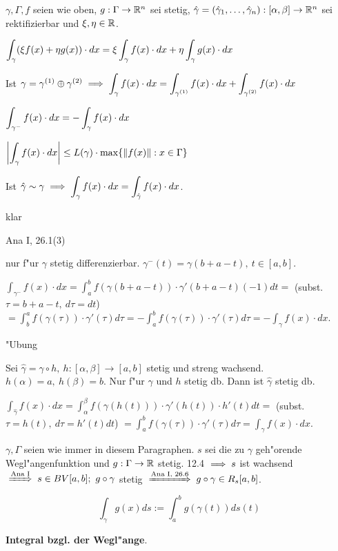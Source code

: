 \documentclass[a4paper,twoside,DIV15,BCOR12mm,chapterprefix=true,headings=twolinechapter]{scrbook}
\begin{document}
\begin{satz}
$\gamma,\Gamma,f$ seien wie oben, $g:\Gamma\to\mathbb{R}^n$ sei stetig, $\hat\gamma = (\hat{\gamma}_1,\ldots,\hat{\gamma}_n): [\alpha,\beta] \to \mathbb{R}^n$ sei rektifizierbar und $\xi,\eta \in \mathbb{R}$.
\begin{liste}
\item $\displaystyle{\int_\gamma(\xi f(x)+\eta g(x))\cdot dx = \xi \int_\gamma f(x)\cdot dx+\eta \int_\gamma g(x)\cdot dx}$
\item Ist $\gamma = \gamma^{(1)} \oplus \gamma^{(2)} \implies \displaystyle{\int_\gamma f(x)\cdot dx = \int_{\gamma^{(1)}} f(x)\cdot dx + \int_{\gamma^{(2)}} f(x)\cdot dx}$
\item $\displaystyle{\int_{\gamma^-} f(x)\cdot dx = -\int_\gamma f(x)\cdot dx}$
\item $\displaystyle{\left| \int_\gamma f(x)\cdot dx\right| \le L(\gamma)\cdot \max\{\|f(x)\|:x \in \Gamma\}}$
\item Ist $\displaystyle{\hat{\gamma} \sim \gamma \ensuremath{\implies}\int_\gamma f(x)\cdot dx = \int_{\hat{\gamma}} f(x)\cdot dx}$.
\end{liste}
\end{satz}

\begin{beweise}
\item klar
\item Ana I, 26.1(3)
\item nur f"ur $\gamma$ stetig differenzierbar. $\gamma^-(t) = \gamma(b+a-t),\ t\in[a,b].$

$\int_{\gamma^-} f(x)\cdot dx = \int_a^b f(\gamma(b+a-t))\cdot \gamma'(b+a-t) (-1) dt =$ (subst. $\tau=b+a-t,\ d\tau = dt$) $= \int_b^a f(\gamma(\tau))\cdot\gamma'(\tau) d\tau = -\int_a^b f(\gamma(\tau))\cdot\gamma'(\tau) d\tau = -\int_\gamma f(x)\cdot dx.$
\item "Ubung
\item Sei $\hat{\gamma} = \gamma\circ h,\ h:[\alpha,\beta]\to[a,b]$ stetig und streng wachsend. $h(\alpha) = a,\ h(\beta) = b$. Nur f"ur $\gamma$ und $h$ stetig db. Dann ist $\hat{\gamma}$ stetig db.

$\int_{\hat{\gamma}} f(x)\cdot dx = \int_\alpha^\beta f(\gamma(h(t)))\cdot \gamma'(h(t))\cdot h'(t) dt =$ (subst. $\tau = h(t),\ d\tau = h'(t)dt$) $= \int_a^b f(\gamma(\tau))\cdot \gamma'(\tau)d\tau = \int_\gamma f(x)\cdot dx.$
\end{beweise}

\begin{definition}
$\gamma,\Gamma$ seien wie immer in diesem Paragraphen. $s$ sei die zu $\gamma$ geh"orende Wegl"angenfunktion und $g:\Gamma \to \mathbb{R}$ stetig. 12.4 $\implies s$ ist wachsend $\folgtnach{Ana I} s \in BV[a,b];\ g\circ\gamma$ stetig $\folgtnach{Ana I, 26.6} g\circ\gamma \in R_s[a,b]$.

$$\int_\gamma g(x) ds := \int_a^b g(\gamma(t))ds(t)$$

\textbf{Integral bzgl. der Wegl"ange}.
\end{definition}
\end{document}
